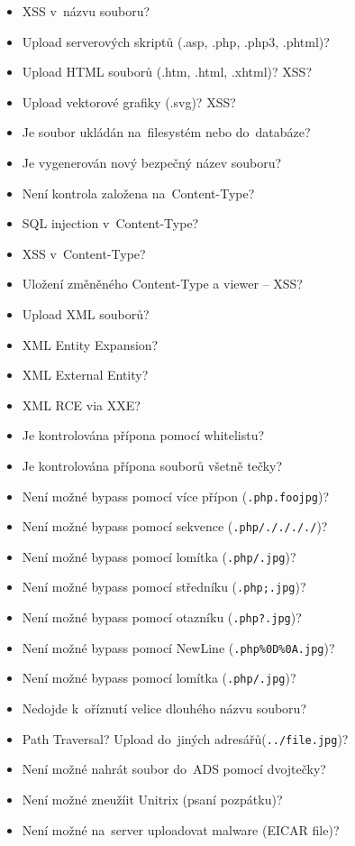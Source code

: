 \begin{itemize}
    \item XSS v~názvu souboru?
    \item Upload serverových skriptů (.asp, .php, .php3, .phtml)?
    \item Upload HTML souborů (.htm, .html, .xhtml)? XSS?
    \item Upload vektorové grafiky (.svg)? XSS?
    \item Je soubor ukládán na~filesystém nebo do~databáze?
    \item Je vygenerován nový bezpečný název souboru?
    \item Není kontrola založena na~Content-Type?
    \item SQL injection v~Content-Type?
    \item XSS v~Content-Type?
    \item Uložení změněného Content-Type a viewer -- XSS?
    \item Upload XML souborů?
    \item XML Entity Expansion?
    \item XML External Entity?
    \item XML RCE via XXE?
    \item Je kontrolována přípona pomocí whitelistu?
    \item Je kontrolována přípona souborů všetně tečky?
    \item Není možné bypass pomocí více přípon (\texttt{.php.foojpg})?
    \item Není možné bypass pomocí sekvence (\texttt{.php/././././})?
    \item Není možné bypass pomocí lomítka (\texttt{.php/.jpg})?
    \item Není možné bypass pomocí středníku (\texttt{.php;.jpg})?
    \item Není možné bypass pomocí otazníku (\texttt{.php?.jpg})?
    \item Není možné bypass pomocí NewLine (\texttt{.php\%0D\%0A.jpg})?
    \item Není možné bypass pomocí lomítka (\texttt{.php/.jpg})?
    \item Nedojde k~oříznutí velice dlouhého názvu souboru?
    \item Path Traversal? Upload do~jiných adresářů(\texttt{../file.jpg})?
    \item Není možné nahrát soubor do~ADS pomocí dvojtečky?
    \item Není možné zneužíit Unitrix (psaní pozpátku)?
    \item Není možné na~server uploadovat malware (EICAR file)?
\end{itemize}
